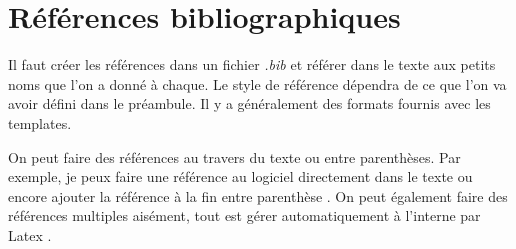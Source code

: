 \documentclass[exemple_master.tex]{subfiles}
\begin{document}
\section{Références bibliographiques}

Il faut créer les références dans un fichier \emph{.bib} et référer dans le texte aux petits noms que l'on a donné à chaque. Le style de référence dépendra de ce que l'on va avoir défini dans le préambule. Il y a généralement des formats fournis avec les templates.

On peut faire des références au travers du texte ou entre parenthèses. Par exemple, je peux faire une référence au logiciel \cite{WHAT2016} directement dans le texte ou encore ajouter la référence à la fin entre parenthèse \citep{WHAT2016}. On peut également faire des références multiples aisément, tout est gérer automatiquement à l'interne par Latex \citep{WHAT2016,ladeveze2016}.
\end{document}
